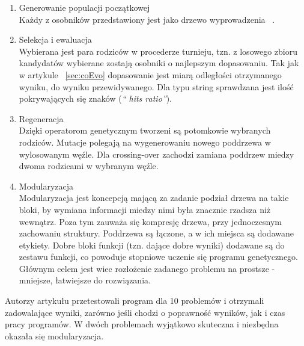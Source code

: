 \documentclass[twoside,a4paper,10]{book}
\begin{document}
\begin{enumerate}
\item Generowanie populacji początkowej \\
Każdy z osobników przedstawiony jest jako drzewo wyprowadzenia ~\citep{parsetree}.
\item Selekcja i ewaluacja \\
Wybierana jest para rodziców w procederze turnieju, tzn. z losowego zbioru kandydatów wybierane zostają osobniki o najlepszym dopasowaniu. Tak jak w artykule ~\ref{sec:coEvo} dopasowanie jest miarą odległości otrzymanego wyniku, do wyniku przewidywanego. Dla typu string sprawdzana jest ilość pokrywających się znaków (\textit{\enquote{ hits ratio}}).
\item Regeneracja\\
Dzięki operatorom genetycznym tworzeni są potomkowie wybranych rodziców. Mutacje polegają na wygenerowaniu nowego poddrzewa w wylosowanym węźle. Dla crossing-over zachodzi zamiana poddrzew miedzy dwoma rodzicami w wybranym węźle. 
\item Modularyzacja \\
Modularyzacja jest koncepcją mającą za zadanie podział drzewa na takie bloki, by wymiana informacji miedzy nimi była znacznie rzadsza niż wewnątrz. Poza tym zauważa się kompresję drzewa, przy jednoczesnym zachowaniu struktury. Poddrzewa są łączone, a w ich miejsca są dodawane etykiety. Dobre bloki funkcji (tzn. dające dobre wyniki) dodawane są do zestawu funkcji, co powoduje stopniowe uczenie się programu genetycznego. Głównym celem jest wiec rozłożenie zadanego problemu na prostsze - mniejsze, łatwiejsze do rozwiązania. 
\end{enumerate}
Autorzy artykułu przetestowali program dla 10 problemów i otrzymali zadowalające wyniki, zarówno jeśli chodzi o poprawność wyników, jak i czas pracy programów.  W dwóch problemach wyjątkowo skuteczna i niezbędna okazała się modularyzacja. 
   
\end{document}
